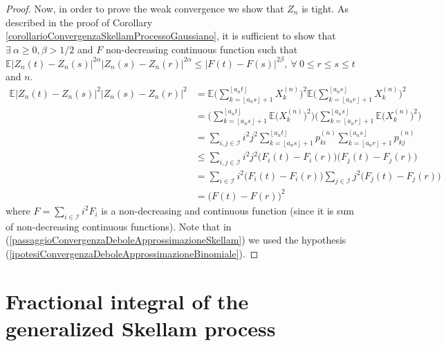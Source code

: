 \documentclass[12pt, twoside, english, headsepline]{article}
\newcommand{\floor}[1]{\left\lfloor #1 \right\rfloor}  %
\theoremstyle{definition} %
\numberwithin{equation}{section} %
\begin{document}
\begin{proof}
Now, in order to prove the weak convergence we show that $Z_n$ is tight. As described in the proof of Corollary \ref{corollarioConvergenzaSkellamProcessoGaussiano}, it is sufficient to show that $\exists \ \alpha\ge0,\beta>1/2$ and $F$ non-decreasing continuous function such that $\mathbb{E}\big|Z_n(t)-Z_n(s) \big|^{2\alpha}\big|Z_n(s)-Z_n(r) \big|^{2\alpha}\le \big|F(t)-F(s) \big|^{2\beta},\ \forall\ 0\le r\le s\le t$ and $n$. 
\begin{align}
\mathbb{E}\big|Z_n(t)-Z_n(s) \big|^2\big|Z_n(s)-Z_n(r) \big|^2 & = \mathbb{E}\Biggl( \sum_{k=\floor{a_n s}+1}^{\floor{a_n t}} X_{k}^{(n)}\Biggr)^2  \mathbb{E}\Biggl( \sum_{k=\floor{a_n r}+1}^{\floor{a_n s}} X_{k}^{(n)}\Biggr)^2  \nonumber\\
&=  \Biggl(\sum_{k=\floor{a_n s}+1}^{\floor{a_n t}}\mathbb{E}\bigl(X_{k}^{(n)}\bigr)^2 \Biggr)\Biggl( \sum_{k=\floor{a_n r}+1}^{\floor{a_n s}} \mathbb{E}\bigl(X_{k}^{(n)}\bigr)^2\Biggr)  \nonumber\\
& =\sum_{i,j\in\mathcal{I}}i^2j^2 \sum_{k=\floor{a_n s}+1}^{\floor{a_n t}}p_{ki}^{(n)} \sum_{k=\floor{a_n r}+1}^{\floor{a_n s}}p_{kj}^{(n)} \nonumber\\
&\le \sum_{i,j\in\mathcal{I}}i^2j^2  \bigl(F_i(t)-F_i(r)\bigr)\bigl(F_j(t)-F_j(r)\bigr) \label{passaggioConvergenzaDeboleApprossimazioneSkellam} \\
& = \sum_{i\in\mathcal{I}}i^2 \bigl(F_i(t)-F_i(r)\bigr)\sum_{j\in\mathcal{I}}j^2 \bigl(F_j(t)-F_j(r)\bigr)  \nonumber\\
& =\bigl(F(t)-F(r)\bigr)^2 \nonumber
\end{align}
where $F = \sum_{i\in\mathcal{I}}i^2F_i$ is a non-decreasing and continuous function (since it is sum of non-decreasing continuous functions). Note that in (\ref{passaggioConvergenzaDeboleApprossimazioneSkellam}) we used the hypothesis (\ref{ipotesiConvergenzaDeboleApprossimazioneBinomiale}).
\end{proof}


\section{Fractional integral of the generalized Skellam process}\label{sezioneIntegraleSkellam}
\end{document}
